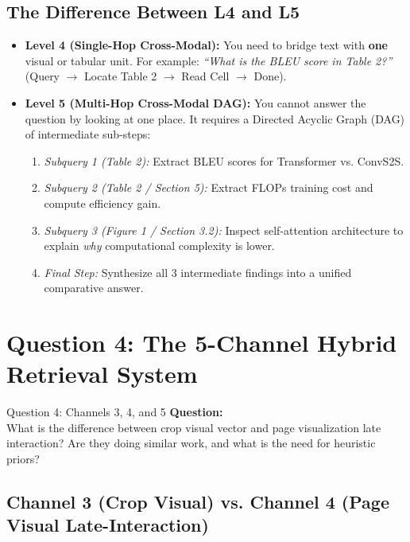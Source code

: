 \documentclass[11pt,a4paper]{article}
\begin{document}
\subsection{The Difference Between L4 and L5}
\begin{itemize}
    \item \textbf{Level 4 (Single-Hop Cross-Modal):} You need to bridge text with \textbf{one} visual or tabular unit. For example: \textit{``What is the BLEU score in Table 2?''} (Query $\to$ Locate Table 2 $\to$ Read Cell $\to$ Done).
    \item \textbf{Level 5 (Multi-Hop Cross-Modal DAG):} You cannot answer the question by looking at one place. It requires a Directed Acyclic Graph (DAG) of intermediate sub-steps:
    \begin{enumerate}[noitemsep]
        \item \textit{Subquery 1 (Table 2):} Extract BLEU scores for Transformer vs. ConvS2S.
        \item \textit{Subquery 2 (Table 2 / Section 5):} Extract FLOPs training cost and compute efficiency gain.
        \item \textit{Subquery 3 (Figure 1 / Section 3.2):} Inspect self-attention architecture to explain \textit{why} computational complexity is lower.
        \item \textit{Final Step:} Synthesize all 3 intermediate findings into a unified comparative answer.
    \end{enumerate}
\end{itemize}

\newpage

\section{Question 4: The 5-Channel Hybrid Retrieval System}

\begin{questionbox}{Question 4: Channels 3, 4, and 5}
\textbf{Question:}\\
What is the difference between crop visual vector and page visualization late interaction? Are they doing similar work, and what is the need for heuristic priors?
\end{questionbox}

\subsection{Channel 3 (Crop Visual) vs. Channel 4 (Page Visual Late-Interaction)}
\end{document}

